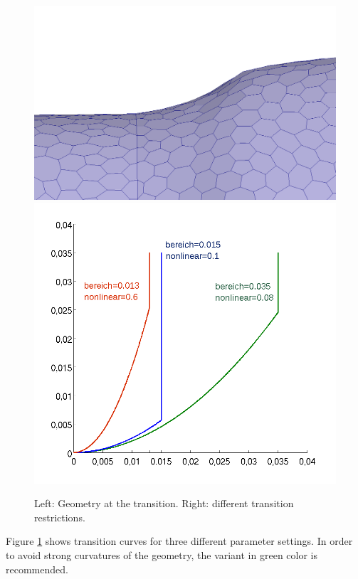 \documentclass[oneside]{article}
\numberwithin{equation}{section}
\numberwithin{figure}{section}
\numberwithin{figure}{section}
\begin{document}
\begin{figure}[htbp]
    \centering
    \includegraphics[scale=0.1]{restriktion1.png} 
    \includegraphics[scale=0.25]{uer_bereich_nonlinear.png} 
    \caption{Left: Geometry at the transition. Right: different transition restrictions.} 
    \label{uer_3kurven}
\end{figure}
Figure \ref{uer_3kurven} shows transition curves for three different parameter settings. In order to avoid strong curvatures of the geometry, the variant in green color is recommended.
\end{document}
